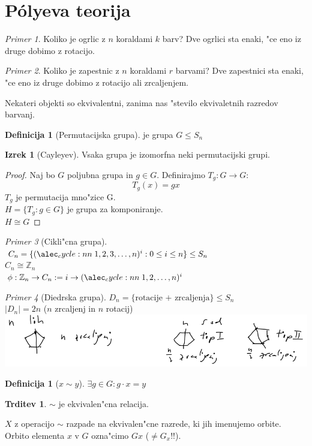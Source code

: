 \documentclass[a4paper,12pt]{article}
\theoremstyle{definition}
\newtheorem{defn}[counter]{Definicija}
\newtheorem{claim}[counter]{Trditev}
\newtheorem{theorem}[counter]{Izrek}
\theoremstyle{remark}
\newtheorem*{ex}{Primer}
\newcommand{\Z}{\mathbb{Z}}
\begin{document}
\section{P\'{o}lyeva teorija}
\begin{ex}
	Koliko je ogrlic z $n$ koraldami $k$ barv?
	Dve ogrlici sta enaki, "ce eno iz druge dobimo z rotacijo.
\end{ex}
\begin{ex}
	Koliko je zapestnic z $n$ koraldami $r$ barvami?
	Dve zapestnici sta enaki, "ce eno iz druge dobimo z rotacijo ali zrcaljenjem.
\end{ex}
Nekateri objekti so ekvivalentni, zanima nas "stevilo ekvivaletnih razredov barvanj.

\begin{defn}[Permutacijska grupa]
	je grupa $G \leq S_n$
\end{defn}
\begin{theorem}[Cayleyev]
	Vsaka grupa je izomorfna neki permutacijski grupi.
\end{theorem}
\begin{proof}
	Naj bo $G$ poljubna grupa in $g \in G$. Definirajmo $T_g: G \rightarrow G$:
	\[ T_g(x) = gx \]
	$T_g$ je permutacija mno"zice G. \\
	$H = \lbrace T_g: g \in G \rbrace$ je grupa za komponiranje. \\
	$H \cong G$
\end{proof}
\begin{ex}[Cikli"cna grupa]
	$C_n = \lbrace \cycle{1, 2, 3, \ldots, n}^i: 0 \leq i \le n \rbrace \leq S_n$\\
	$C_n \cong \Z_n$\\
	$\phi: \Z_n \rightarrow C_n := i \rightarrow \cycle{1, 2, \ldots, n}^i$
\end{ex}

\begin{ex}[Diedrska grupa]
	$D_n = \lbrace \text{rotacije + zrcaljenja} \rbrace \leq S_n$\\
	$|D_n| = 2n$ ($n$ zrcaljenj in $n$ rotacij)
	\\
	\includegraphics{diedrska}
\end{ex}
\begin{defn}[$x \sim y$]
	$\exists g \in G: g \cdot x = y$
\end{defn}
\begin{claim}
	$\sim$ je ekvivalen"cna relacija.
\end{claim}
$X$ z operacijo $\sim$ razpade na ekvivalen"cne razrede, ki jih imenujemo orbite. Orbito elementa $x$ v $G$ ozna"cimo $Gx$ ($\neq G_x$!!).
\end{document}
